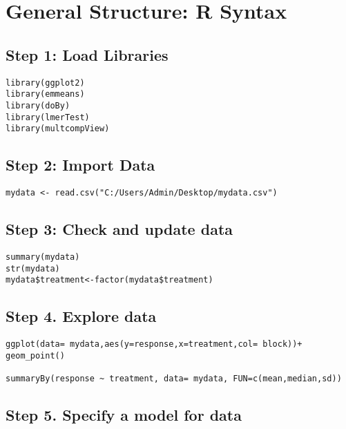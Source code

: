 \documentclass[]{book}
\theoremstyle{definition}
\theoremstyle{definition}
\theoremstyle{definition}
\theoremstyle{remark}
\begin{document}
\section{General Structure: R Syntax}\label{general-structure-r-syntax}

\subsection{Step 1: Load Libraries}\label{step-1-load-libraries}

\begin{verbatim}
library(ggplot2)
library(emmeans)
library(doBy)
library(lmerTest)
library(multcompView)
\end{verbatim}

\subsection{Step 2: Import Data}\label{step-2-import-data}

\begin{verbatim}
mydata <- read.csv("C:/Users/Admin/Desktop/mydata.csv")
\end{verbatim}

\subsection{Step 3: Check and update
data}\label{step-3-check-and-update-data}

\begin{verbatim}
summary(mydata)
str(mydata)
mydata$treatment<-factor(mydata$treatment)
\end{verbatim}

\subsection{Step 4. Explore data}\label{step-4.-explore-data}

\begin{verbatim}
ggplot(data= mydata,aes(y=response,x=treatment,col= block))+
geom_point()

summaryBy(response ~ treatment, data= mydata, FUN=c(mean,median,sd))
\end{verbatim}

\subsection{Step 5. Specify a model for
data}\label{step-5.-specify-a-model-for-data}
\end{document}
